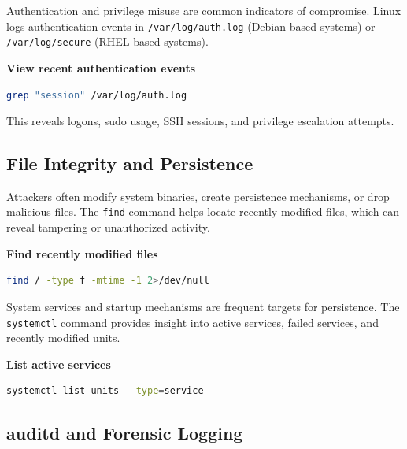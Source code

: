 Authentication and privilege misuse are common indicators of compromise. Linux logs authentication events in 
\texttt{/var/log/auth.log} (Debian-based systems) or \texttt{/var/log/secure} (RHEL-based systems).

\textbf{View recent authentication events}

\begin{lstlisting}[language=bash]
grep "session" /var/log/auth.log
\end{lstlisting}

This reveals logons, sudo usage, SSH sessions, and privilege escalation attempts.


\subsection*{File Integrity and Persistence}

Attackers often modify system binaries, create persistence mechanisms, or drop malicious files. 
The \texttt{find} command helps locate recently modified files, which can reveal tampering or unauthorized activity.

\textbf{Find recently modified files}

\begin{lstlisting}[language=bash]
find / -type f -mtime -1 2>/dev/null
\end{lstlisting}

System services and startup mechanisms are frequent targets for persistence. The \texttt{systemctl} command provides insight 
into active services, failed services, and recently modified units.

\textbf{List active services}

\begin{lstlisting}[language=bash]
systemctl list-units --type=service
\end{lstlisting}


\subsection*{auditd and Forensic Logging}

